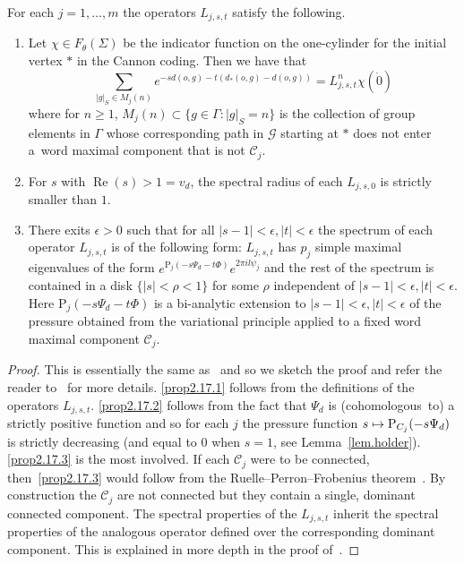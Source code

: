 \documentclass[10pt]{amsart}
\theoremstyle{definition}\newtheorem{defi}[theo]{Definition}\newtheorem{rema}[theo]{Remark}\newtheorem{exam}[theo]{Example}\newtheorem{exem}[theo]{Example}\newtheorem{nota}[theo]{Notation}
\newcommand{\G}{\Gamma}
\renewcommand{\SS}{\Sigma}
\newcommand{\p}{\psi}
\renewcommand{\P}{\Psi}
\newcommand{\Cc}{\mathcal{C}}
\newcommand{\Gc}{\mathcal{G}}
\DeclareMathOperator{\rRe}{Re}
\newcommand*\rmP{\mathrm{P}}
\let\oldmapsto\mapsto
\renewcommand*{\mapsto}{\mathchoice{\longmapsto}{\oldmapsto}{\oldmapsto}{\oldmapsto}}
\theoremstyle{plain}
\begin{document}
\begin{prop}\label{prop.sr}
For each $j=1,\dots, m$ the operators $L_{j,s,t}$ satisfy the following.
\begin{enumerate}
\item\label{prop2.17.1} Let $\chi \in F_\theta(\SS)$ be the indicator function on the one-cylinder for the initial vertex $\ast$ in the Cannon coding. Then we have that
\[
\sum_{|g|_S \in M_j(n)} e^{-s d(o,g) - t(d_\ast(o,g) - d(o,g))} = L_{j,s,t}^n \chi(\dot{0})
\]
where for $n\ge 1$, $M_j(n) \subset \{g\in\G: |g|_S = n\}$ is the collection of group elements in $\G$ whose corresponding path in $\Gc$ starting at $\ast$ does not enter a~word maximal component that is not $\Cc_j$.
\item\label{prop2.17.2} For $s$ with $\rRe(s) > 1 = v_d$, the spectral radius of each $L_{j,s,0}$ is strictly smaller than $1$.
\item\label{prop2.17.3} There exits $\epsilon > 0$ such that for all $|s - 1| < \epsilon, |t| < \epsilon$ the spectrum of each operator $L_{j,s,t}$ is of the following form: $L_{j,s,t}$ has $p_j$ simple maximal eigenvalues of the form $e^{\rmP_j(-s\P_d - t\Phi)} e^{2\pi i l\p_j}$ and the rest of the spectrum is contained in a disk $\{|s| < \rho < 1\}$ for some $\rho$ independent of $|s-1|<\epsilon, |t| < \epsilon$. Here $\rmP_j(-s\P_d - t\Phi)$ is a bi-analytic extension to $|s-1|<\epsilon, |t| < \epsilon$ of the pressure obtained from the variational principle applied to a fixed word maximal component $\Cc_j$.
\end{enumerate}
\end{prop}
\begin{proof}
This is essentially the same as~\cite[Proposition~4.3]{cantrell} and so we sketch the proof and refer the reader to~\cite{cantrell} for more details. \eqref{prop2.17.1} follows from the definitions of the operators $L_{j,s,t}$. \eqref{prop2.17.2} follows from the fact that $\Psi_d$ is (cohomologous~to) a strictly positive function and so for each $j$ the pressure function $s \mapsto \rmP_{C_j}(-s\Psi_d)$ is strictly decreasing (and equal to $0$ when $s = 1$, see Lemma~\ref{lem.holder}). \eqref{prop2.17.3} is the most involved. If each $\Cc_j$ were to be connected, then~\eqref{prop2.17.3} would follow from the {Ruelle--Perron--Frobenius theorem}~\cite{ParryPollicott}. By construction the $\Cc_j$ are not connected but they contain a single, dominant connected component. The spectral properties of the $L_{j,s,t}$ inherit the spectral properties of the analogous operator defined over the corresponding dominant component. This is explained in more depth in the proof of~\cite[Proposition~4.3]{cantrell}.
\end{proof}
\end{document}
